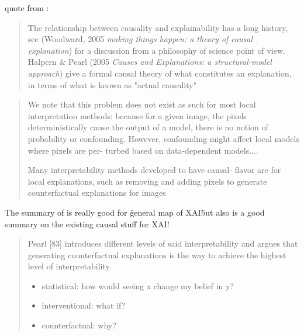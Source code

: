       {
            \color{red}
            quote from \cite{Goyal2019}:

            \begin{quote}
                  The relationship between causality and explainability has a
                  long history, see (Woodward, 2005 \textit{making things happen: a theory of causal explanation}) for a discussion from
                  a philosophy of science point of view. Halpern \& Pearl
                  (2005 \textit{Causes and Explanations: a structural-model approach}) give a formal causal theory of what constitutes an
                  explanation, in terms of what is known as "actual causality"
            \end{quote}

            \begin{quote}
                  We note that this problem does not exist as such for most
                  local interpretation methods: because for a given image,
                  the pixels deterministically cause the output of a model,
                  there is no notion of probability or confounding. However,
                  confounding might affect local models where pixels are per-
                  turbed based on data-dependent models....

                  Many interpretability methods developed to have causal-
                  flavor are for local explanations, such as removing and
                  adding pixels to generate counterfactual explanations for
                  images
            \end{quote}

            The summary of \cite{Moraffah2020a} is really good for \"general map of XAI\" but also is a good summary on the existing causal stuff for XAI! 

            \begin{quote}
                  Pearl [83] introduces different levels of said interpretability
                  and argues that generating counterfactual explanations is
                  the way to achieve the highest level of interpretability.

                  \begin{itemize}
                        \item statistical: how would seeing x change my belief in y?
                        \item interventional: what if?
                        \item counterfactual: why?
                  \end{itemize}
            \end{quote}

}
